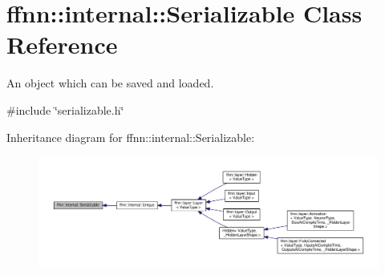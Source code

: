 \hypertarget{classffnn_1_1internal_1_1_serializable}{\section{ffnn\-:\-:internal\-:\-:Serializable Class Reference}
\label{classffnn_1_1internal_1_1_serializable}
}


An object which can be saved and loaded.  




{\ttfamily \#include \char`\"{}serializable.\-h\char`\"{}}



Inheritance diagram for ffnn\-:\-:internal\-:\-:Serializable\-:\nopagebreak
\begin{figure}[H]
\begin{center}
\leavevmode
\includegraphics[width=350pt]{classffnn_1_1internal_1_1_serializable__inherit__graph}
\end{center}
\end{figure}
